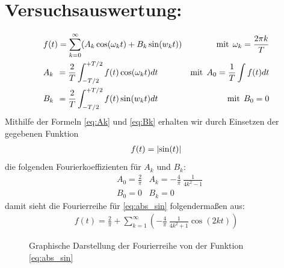 \section{Versuchsauswertung:}
    \begin{align}   %
        &f(t) = \sum_{k=0}^{\infty} (A_k \cos(\omega_kt) + B_k \sin(w_kt))  &\text{mit} \:\: \omega_k = \frac{2\pi k}{T} \label{eq:frow}\\
        &A_k \hphantom{)} = \frac{2}{T} \int_{-T/2}^{+T/2} f(t) \cos(\omega_kt) dt  &\text{mit} \:\: A_0 = \frac{1}{T} \int f(t)dt \label{eq:Ak}\\
        &B_k \hphantom{)} = \frac{2}{T} \int_{-T/2}^{+T/2} f(t) \sin(w_kt) dt \!\!&\text{mit} \:\: B_0 = 0 \label{eq:Bk}
    \end{align}
    Mithilfe der Formeln \eqref{eq:Ak} und \eqref{eq:Bk} erhalten wir durch Einsetzen der gegebenen Funktion
    \begin{align}
        f(t) = \lvert\sin(t)\rvert \label{eq:abs_sin} 
    \end{align}
    die folgenden Fourierkoeffizienten für $A_k$ und $B_k$:
    \begin{align*}
        &A_0 = \frac{2}{\pi} &A_k = -\frac{4}{\pi}\:\frac{1}{4k^{2}-1}\\
        &B_0 = 0 &B_k = 0
    \end{align*}
    damit sieht die Fourierreihe für \eqref{eq:abs_sin} folgendermaßen aus:
    \begin{align}
        f(t)=\frac{2}{\pi}+\sum_{k=1}^{\infty} \left(-\frac{4}{\pi} \:\frac{1}{4k^2+1} \cos(2kt)\right)
    \end{align}
    \begin{figure}[h]
         \centering
           \vspace{-1.5em}
         \caption{Graphische Darstellung der Fourierreihe von der Funktion \eqref{eq:abs_sin}}
         \label{fig:sc_sin} 
    \end{figure}
